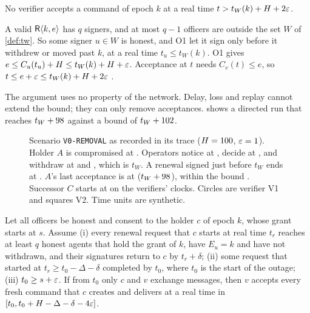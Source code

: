 \begin{prp}
\label{prp:wte}
No verifier accepts a command of epoch $k$ at a real time $t > t_W(k) + H + 2\varepsilon$.
\end{prp}

\begin{argument}
A valid $\mathsf{R}\langle k, e\rangle$ has $q$ signers, and at most $q - 1$ officers are outside the set
$W$ of \cref{def:tw}. So some signer $u \in W$ is honest, and O1 let it sign only before
it withdrew or moved past $k$, at a real time $t_u \le t_W(k)$. O1 gives
$e \le C_u(t_u) + H \le t_W(k) + H + \varepsilon$. Acceptance at $t$ needs $C_v(t) \le e$, so
$t \le e + \varepsilon \le t_W(k) + H + 2\varepsilon$ .
\end{argument}

The argument uses no property of the network. Delay, loss and replay cannot extend the
bound; they can only remove acceptances.  shows a directed run that
reaches $t_W + 98$ against a bound of $t_W + 102$.

\begin{figure}[t]
\centering

\caption{Scenario \texttt{V0-REMOVAL} as recorded in its trace ($H = 100$,
$\varepsilon = 1$). Holder $A$ is compromised at \RemovalCompromise{}. Operators notice
at \RemovalDetection{}, decide at \RemovalDecision{}, and withdraw at
\RemovalFirstWithdraw{} and \RemovalTW{}, which is $t_W$. A renewal signed just before
$t_W$ ends at \RemovalLastValidEnd{}. $A$'s last acceptance is at \RemovalLastHostile{}
($t_W + 98$), within the bound \RemovalBound{}. Successor $C$ starts at
\RemovalSuccessorStart{} on the verifiers' clocks. Circles are verifier V1 and squares
V2. Time units are synthetic.}
\label{fig:removal}
\end{figure}

\begin{prp}
\label{prp:avail}
Let all officers be honest and consent to the holder $c$ of epoch $k$, whose grant starts
at $s$. Assume (i) every renewal request that $c$ starts at real time $t_r$ reaches at
least $q$ honest agents that hold the grant of $k$, have $E_u = k$ and have not withdrawn,
and their signatures return to $c$ by $t_r + \delta$; (ii) some request that started at
$t_r \ge t_0 - \Delta - \delta$ completed by $t_0$, where $t_0$ is the start of the outage;
(iii) $t_0 \ge s + \varepsilon$. If from $t_0$ only $c$ and $v$ exchange messages, then $v$
accepts every fresh command that $c$ creates and delivers at a real time in
$[t_0, t_0 + H - \Delta - \delta - 4\varepsilon]$.
\end{prp}

